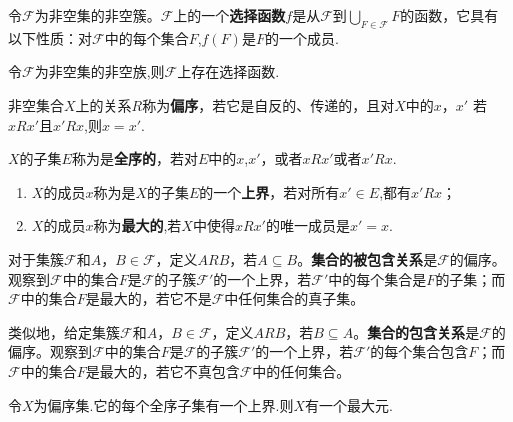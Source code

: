 \documentclass[lang=cn,newtx,10pt,scheme=chinese]{../Template/elegantbook}
\begin{document}
\begin{definition}[选择函数]\label{definition:选择函数}
  令\(\mathcal{F}\)为非空集的非空簇。\(\mathcal{F}\)上的一个\textbf{选择函数}\(f\)是从\(\mathcal{F}\)到\(\bigcup_{F\in\mathcal{F}}F\)的函数，它具有以下性质：对\(\mathcal{F}\)中的每个集合\(F\),\(f(F)\)是\(F\)的一个成员.
\end{definition}

\begin{axiom}[Zermelo选择公理]\label{axiom:Zermelo选择公理}
  令\(\mathcal{F}\)为非空集的非空族,则\(\mathcal{F}\)上存在选择函数.
\end{axiom}

\begin{definition}[序关系]\label{definition:序关系}
  非空集合\(X\)上的关系\(R\)称为\textbf{偏序}，若它是自反的、传递的，且对\(X\)中的\(x\)，\(x'\) 
若\(xRx'\)且\(x'Rx\),则\(x = x'\).

\(X\)的子集\(E\)称为是\textbf{全序的}，若对\(E\)中的\(x\),\(x'\)，或者\(xRx'\)或者\(x'Rx\).
\begin{enumerate}
  \item \(X\)的成员\(x\)称为是\(X\)的子集\(E\)的一个\textbf{上界}，若对所有\(x'\in E\),都有\(x'Rx\)；
  
  \item \(X\)的成员\(x\)称为\textbf{最大的},若\(X\)中使得\(xRx'\)的唯一成员是\(x' = x\).
\end{enumerate}
\end{definition}
\begin{note}
对于集簇\(\mathcal{F}\)和\(A\)，\(B\in\mathcal{F}\)，定义\(ARB\)，若\(A\subseteq B\)。\textbf{集合的被包含关系}是\(\mathcal{F}\)的偏序。观察到\(\mathcal{F}\)中的集合\(F\)是\(\mathcal{F}\)的子簇\(\mathcal{F}'\)的一个上界，若\(\mathcal{F}'\)中的每个集合是\(F\)的子集；而\(\mathcal{F}\)中的集合\(F\)是最大的，若它不是\(\mathcal{F}\)中任何集合的真子集。

类似地，给定集簇\(\mathcal{F}\)和\(A\)，\(B\in\mathcal{F}\)，定义\(ARB\)，若\(B\subseteq A\)。\textbf{集合的包含关系}是\(\mathcal{F}\)的偏序。观察到\(\mathcal{F}\)中的集合\(F\)是\(\mathcal{F}\)的子簇\(\mathcal{F}'\)的一个上界，若\(\mathcal{F}'\)的每个集合包含\(F\)；而\(\mathcal{F}\)中的集合\(F\)是最大的，若它不真包含\(\mathcal{F}\)中的任何集合。
\end{note}



\begin{lemma}[Zorn引理]\label{theorem:Zorn引理}
  令\(X\)为偏序集.它的每个全序子集有一个上界.则\(X\)有一个最大元.
\end{lemma}
\end{document}
